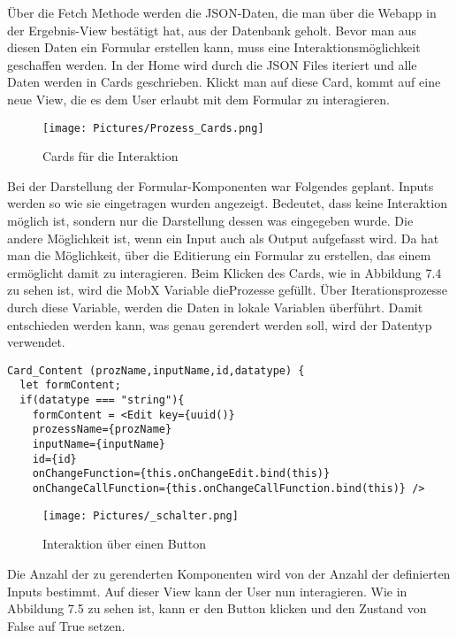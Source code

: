 \documentclass[a4paper,11pt]{scrreprt}
\begin{document}
Über die Fetch Methode werden die JSON-Daten, die man über die Webapp in der Ergebnis-View bestätigt hat, aus der Datenbank geholt. Bevor man aus diesen Daten ein Formular erstellen kann, muss eine Interaktionsmöglichkeit geschaffen werden. 
In der Home wird durch die JSON Files iteriert und alle Daten werden in Cards geschrieben. Klickt man auf diese Card, kommt auf eine neue View, die es dem User erlaubt mit dem Formular zu interagieren.
\begin{figure}[ht]
\centering
\texttt{[image: Pictures/Prozess\_Cards.png]}
\caption{Cards für die Interaktion}
\label{JSON Bildung über Boxen}
\end{figure}
\hfill \break

Bei der Darstellung der Formular-Komponenten war Folgendes geplant. 
Inputs werden so wie sie eingetragen wurden angezeigt. Bedeutet, dass keine Interaktion möglich ist, sondern nur die Darstellung dessen was eingegeben wurde. Die andere Möglichkeit ist, wenn ein Input auch als Output aufgefasst wird. Da hat man die Möglichkeit, über die Editierung ein Formular zu erstellen, das einem ermöglicht damit zu interagieren.
\hfill \break
\hfill \break
Beim Klicken des Cards, wie in Abbildung 7.4 zu sehen ist, wird die MobX Variable dieProzesse gefüllt. Über Iterationsprozesse durch diese Variable, werden die Daten in lokale Variablen überführt. 
Damit entschieden werden kann, was genau gerendert werden soll, wird der Datentyp verwendet. 
\begin{lstlisting}
Card_Content (prozName,inputName,id,datatype) {
  let formContent;
  if(datatype === "string"){
    formContent = <Edit key={uuid()}
    prozessName={prozName}
    inputName={inputName}
    id={id}
    onChangeFunction={this.onChangeEdit.bind(this)}
    onChangeCallFunction={this.onChangeCallFunction.bind(this)} />
\end{lstlisting}
\begin{figure}[ht]
\centering
\texttt{[image: Pictures/\_schalter.png]}
\caption{Interaktion über einen Button}
\label{JSON Bildung über Boxen}
\end{figure}
\hfill \break
Die Anzahl der zu gerenderten Komponenten wird von der Anzahl der definierten Inputs bestimmt. Auf dieser View kann der User nun interagieren. Wie in Abbildung 7.5 zu sehen ist, kann er den Button klicken und den Zustand von False auf True setzen. 
\end{document}
